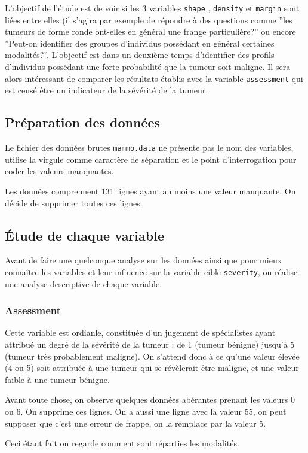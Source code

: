 \documentclass[a4paper]{report}
\begin{document}
L'objectif de l'étude est de voir si les 3 variables \verb|shape| , \verb|density| et \verb|margin| sont liées entre elles (il s'agira par exemple de répondre à des questions comme ''les tumeurs de forme ronde ont-elles en général une frange particulière?'' ou encore ''Peut-on identifier des groupes d'individus possédant en général certaines modalités?''. L'objectif est dans un deuxième temps d'identifier des profils d'individus possédant une forte probabilité que la tumeur soit maligne. Il sera alors intéressant de comparer les résultats établis avec la variable \verb|assessment| qui est censé être un indicateur de la sévérité de la tumeur.

\subsection{Préparation des données}
Le fichier des données brutes \verb|mammo.data| ne présente pas le nom des variables, utilise la virgule comme caractère de séparation et le point d'interrogation pour coder les valeurs manquantes. 

Les données comprennent 131 lignes ayant au moins une valeur manquante. On décide de supprimer toutes ces lignes.


\subsection{Étude de chaque variable}
Avant de faire une quelconque analyse sur les données ainsi que pour mieux connaître les variables et leur influence sur la variable cible \verb|severity|, on réalise une analyse descriptive de chaque variable.

\subsubsection{Assessment}
Cette variable est ordianle, constituée d'un jugement de spécialistes ayant attribué un degré de la sévérité de la tumeur : de 1 (tumeur bénigne) jusqu'à 5 (tumeur très probablement maligne). On s'attend donc à ce qu'une valeur élevée (4 ou 5) soit attribuée à une tumeur qui se révèlerait être maligne, et une valeur faible à une tumeur bénigne.

Avant toute chose, on observe quelques données abérantes prenant les valeurs 0 ou 6. On supprime ces lignes. On a aussi une ligne avec la valeur 55, on peut supposer que c'est une erreur de frappe, on la remplace par la valeur 5.

Ceci étant fait on regarde comment sont réparties les modalités.
\end{document}
